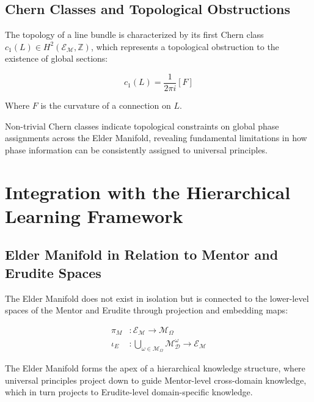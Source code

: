 \subsection{Chern Classes and Topological Obstructions}

The topology of a line bundle is characterized by its first Chern class $c_1(L) \in H^2(\mathcal{E}_{\mathcal{M}}, \mathbb{Z})$, which represents a topological obstruction to the existence of global sections:

\begin{equation}
c_1(L) = \frac{1}{2\pi i}[F]
\end{equation}

Where $F$ is the curvature of a connection on $L$.

\begin{theorem}
Non-trivial Chern classes indicate topological constraints on global phase assignments across the Elder Manifold, revealing fundamental limitations in how phase information can be consistently assigned to universal principles.
\end{theorem}

\section{Integration with the Hierarchical Learning Framework}

\subsection{Elder Manifold in Relation to Mentor and Erudite Spaces}

The Elder Manifold does not exist in isolation but is connected to the lower-level spaces of the Mentor and Erudite through projection and embedding maps:

\begin{equation}
\begin{aligned}
\pi_M &: \mathcal{E}_{\mathcal{M}} \rightarrow \mathcal{M}_{\Omega} \\
\iota_E &: \bigcup_{\omega \in \mathcal{M}_{\Omega}} \mathcal{M}_{\mathcal{D}}^{\omega} \rightarrow \mathcal{E}_{\mathcal{M}}
\end{aligned}
\end{equation}

\begin{theorem}
The Elder Manifold forms the apex of a hierarchical knowledge structure, where universal principles project down to guide Mentor-level cross-domain knowledge, which in turn projects to Erudite-level domain-specific knowledge.
\end{theorem}

